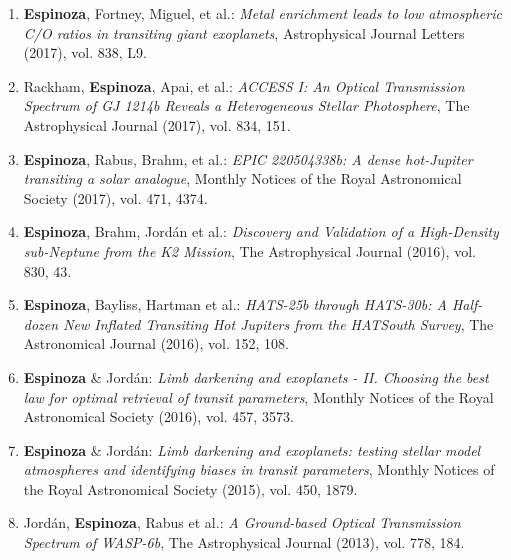 \documentclass[12pt, a4paper]{article} %
\begin{document}
\begin{flushleft}
\begin{enumerate}
\item \textbf{Espinoza}, Fortney, Miguel, et al.: \textit{Metal enrichment leads to low atmospheric C/O ratios in transiting giant exoplanets}, Astrophysical Journal Letters (2017), vol. 838, L9.
\item Rackham, \textbf{Espinoza}, Apai, et al.: \textit{ACCESS I: An Optical Transmission Spectrum of GJ 1214b Reveals a Heterogeneous Stellar Photosphere}, The Astrophysical Journal (2017), vol. 834, 151.
\item \textbf{Espinoza}, Rabus, Brahm, et al.: \textit{EPIC 220504338b: A dense hot-Jupiter transiting a solar analogue}, Monthly Notices of the Royal Astronomical Society (2017), vol. 471, 4374.
\item \textbf{Espinoza}, Brahm, Jord\'an et al.: \textit{Discovery and Validation of a High-Density sub-Neptune from the K2 Mission}, The Astrophysical Journal (2016), vol. 830, 43.
\item \textbf{Espinoza}, Bayliss, Hartman et al.: \textit{HATS-25b through HATS-30b: A Half-dozen New Inflated Transiting Hot Jupiters from the HATSouth Survey}, The Astronomical Journal (2016), vol. 152, 108.
\item \textbf{Espinoza} \& Jord\'an: \textit{Limb darkening and exoplanets - II. Choosing the best law for optimal retrieval of transit parameters}, Monthly Notices of the Royal Astronomical Society (2016), vol. 457, 3573.
\item \textbf{Espinoza} \& Jord\'an: \textit{Limb darkening and exoplanets: testing stellar model atmospheres and identifying biases in transit parameters}, Monthly Notices of the Royal Astronomical Society (2015), vol. 450, 1879.
\item Jord\'an, \textbf{Espinoza}, Rabus et al.: \textit{A Ground-based Optical Transmission Spectrum of WASP-6b}, The Astrophysical Journal (2013), vol. 778, 184.
\end{enumerate}


\end{flushleft}
\end{document}
